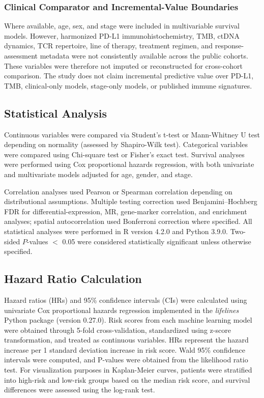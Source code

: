 \documentclass[pdflatex,sn-mathphys-num,referee,lineno]{sn-jnl}
\theoremstyle{thmstyleone}%
\theoremstyle{thmstyletwo}%
\theoremstyle{thmstylethree}%
\begin{document}
\subsubsection{Clinical Comparator and Incremental-Value Boundaries}
Where available, age, sex, and stage were included in multivariable survival models. However, harmonized PD-L1 immunohistochemistry, TMB, ctDNA dynamics, TCR repertoire, line of therapy, treatment regimen, and response-assessment metadata were not consistently available across the public cohorts. These variables were therefore not imputed or reconstructed for cross-cohort comparison. The study does not claim incremental predictive value over PD-L1, TMB, clinical-only models, stage-only models, or published immune signatures.

\subsection{Statistical Analysis}
Continuous variables were compared via Student's t-test or Mann-Whitney U test depending on normality (assessed by Shapiro-Wilk test). Categorical variables were compared using Chi-square test or Fisher's exact test. Survival analyses were performed using Cox proportional hazards regression, with both univariate and multivariate models adjusted for age, gender, and stage.

Correlation analyses used Pearson or Spearman correlation depending on distributional assumptions. Multiple testing correction used Benjamini--Hochberg FDR for differential-expression, MR, gene-marker correlation, and enrichment analyses; spatial autocorrelation used Bonferroni correction where specified. All statistical analyses were performed in R version 4.2.0 and Python 3.9.0. Two-sided $P$-values $<$ 0.05 were considered statistically significant unless otherwise specified.

\subsection{Hazard Ratio Calculation}
Hazard ratios (HRs) and 95\% confidence intervals (CIs) were calculated using univariate Cox proportional hazards regression implemented in the \textit{lifelines} Python package (version 0.27.0). Risk scores from each machine learning model were obtained through 5-fold cross-validation, standardized using z-score transformation, and treated as continuous variables. HRs represent the hazard increase per 1 standard deviation increase in risk score. Wald 95\% confidence intervals were computed, and P-values were obtained from the likelihood ratio test. For visualization purposes in Kaplan-Meier curves, patients were stratified into high-risk and low-risk groups based on the median risk score, and survival differences were assessed using the log-rank test.
\end{document}
